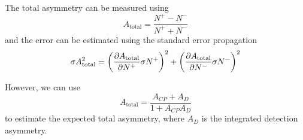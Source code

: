 \documentclass{article}
\begin{document}
    The total asymmetry can be measured using
    \begin{equation}
        A_{\text{total}} = \frac{N^+ - N^-}{N^+ + N^-}
    \end{equation}
    and the error can be estimated using the standard error propagation
    \begin{equation}
        \sigma A_{\text{total}} ^2 = \left(\pdv{A_{\text{total}}}{N^+}\sigma N^+\right)^2 + \left(\pdv{A_{\text{total}}}{N^-}\sigma N^-\right)^2
    \end{equation}

    However, we can use 
    \begin{equation}
        A_{\text{total}} = \frac{A_{CP} + A_D}{1 + A_{CP}A_D}
    \end{equation}
    to estimate the expected total asymmetry, where $A_{D}$ is the integrated detection asymmetry.
    
\end{document}

